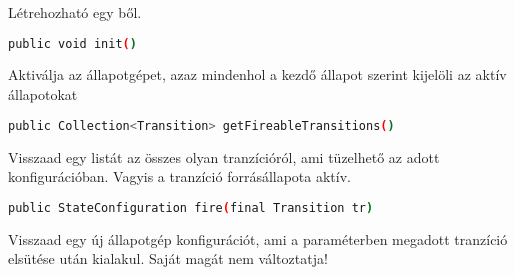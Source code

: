 Létrehozható egy {\thetaSc}ből.

\begin{lstlisting}[language=bash,morekeywords={sudo,apt\-get},alsoletter={-},breaklines=true]
public void init()
\end{lstlisting}

Aktiválja az állapotgépet, azaz mindenhol a kezdő állapot szerint kijelöli az aktív állapotokat

\begin{lstlisting}[language=bash,morekeywords={sudo,apt\-get},alsoletter={-},breaklines=true]
	public Collection<Transition> getFireableTransitions()
\end{lstlisting}

Visszaad egy listát az összes olyan tranzícióról, ami tüzelhető az adott konfigurációban. Vagyis a tranzíció forrásállapota aktív.

\begin{lstlisting}[language=bash,morekeywords={sudo,apt\-get},alsoletter={-},breaklines=true]
public StateConfiguration fire(final Transition tr)
\end{lstlisting}

Visszaad egy új állapotgép konfigurációt, ami a paraméterben megadott tranzíció elsütése után kialakul. Saját magát nem változtatja!

